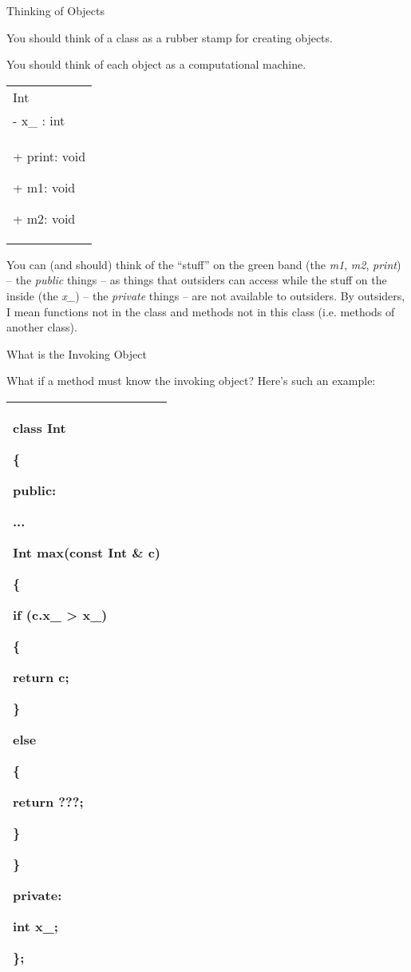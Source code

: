 \documentclass[
]{article}
\begin{document}
Thinking of Objects

You should think of a class as a rubber stamp for creating objects.

You should think of each object as a computational machine.

\begin{longtable}[]{@{}l@{}}
\toprule
\endhead
Int\tabularnewline
- x\_ : int \tabularnewline
\begin{minipage}[t]{0.97\columnwidth}\raggedright
+ print: void

+ m1: void

+ m2: void \strut
\end{minipage}\tabularnewline
\bottomrule
\end{longtable}

You can (and should) think of the ``stuff'' on the green band (the
\emph{m1}, \emph{m2}, \emph{print}) -- the \emph{public} things -- as
things that outsiders can access while the stuff on the inside (the
\emph{x\_}) -- the \emph{private} things -- are not available to
outsiders. By outsiders, I mean functions not in the class and methods
not in this class (i.e. methods of another class).

What is the Invoking Object

What if a method must know the invoking object? Here's such an example:

\begin{longtable}[]{@{}l@{}}
\toprule
\endhead
\begin{minipage}[t]{0.97\columnwidth}\raggedright
class Int

\{

public:

...

\textbf{Int max(const Int \& c) }

\{

if (c.x\_ \textgreater{} x\_)

\{

return c;

\}

else

\{

return ???;

\}

\}

private:

int x\_;

\};\strut
\end{minipage}\tabularnewline
\bottomrule
\end{longtable}
\end{document}
